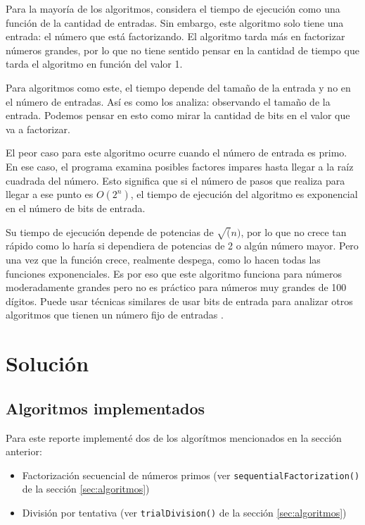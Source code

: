 \documentclass{article}
\begin{document}
Para la mayoría de los algoritmos, considera el tiempo de ejecución como una
función de la cantidad de entradas. Sin embargo, este algoritmo solo tiene una
entrada: el número que está factorizando. El algoritmo tarda más en factorizar
números grandes, por lo que no tiene sentido pensar en la cantidad de tiempo que
tarda el algoritmo en función del valor 1. 

Para algoritmos como este, el tiempo depende del tamaño de la entrada y no en el
número de entradas. Así es como los analiza: observando el tamaño de la entrada.
Podemos pensar en esto como mirar la cantidad de bits en el valor que va a
factorizar.

El peor caso para este algoritmo ocurre cuando el número de entrada es primo. En
ese caso, el programa examina posibles factores impares hasta llegar a la raíz
cuadrada del número. Esto significa que si el número de pasos que realiza para
llegar a ese punto es $ O(2^n)$, el tiempo de ejecución del algoritmo es
exponencial en el número de bits de entrada.

Su tiempo de ejecución depende de potencias de $\sqrt(n)$, por lo que no crece
tan rápido como lo haría si dependiera de potencias de 2 o algún número mayor.
Pero una vez que la función crece, realmente despega, como lo hacen todas las
funciones exponenciales. Es por eso que este algoritmo funciona para números
moderadamente grandes pero no es práctico para números muy grandes de 100
dígitos. Puede usar técnicas similares de usar bits de entrada para analizar
otros algoritmos que tienen un número fijo de entradas
\cite{stephens2015learning}.


\section{Solución}

\subsection{Algoritmos implementados}

Para este reporte implementé dos de los algorítmos mencionados en la sección
anterior:

\begin{itemize}
\item Factorización secuencial de números primos (ver
\texttt{sequentialFactorization()} de la sección \ref{sec:algoritmos})
    \item División por tentativa (ver
    \texttt{trialDivision()} de la sección \ref{sec:algoritmos})
\end{itemize}
\end{document}

